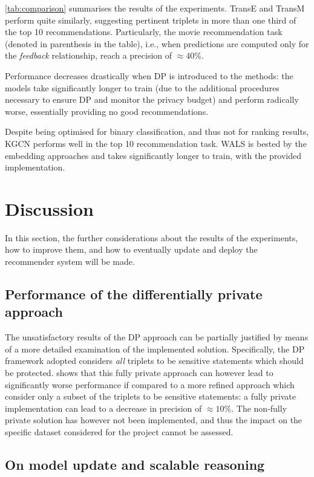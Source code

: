 \cref{tab:comparison} summarises the results of the experiments.
TransE and TransM perform quite similarly, suggesting pertinent triplets in more than one third of the top 10 recommendations.
Particularly, the movie recommendation task (denoted in parenthesis in the table), i.e., when predictions are computed only for the \emph{feedback} relationship, reach a precision of $\approx{40}\%$.

Performance decreases drastically when DP is introduced to the methods: the models take significantly longer to train (due to the additional procedures necessary to ensure DP and monitor the privacy budget) and perform radically worse, essentially providing no good recommendations.

Despite being optimised for binary classification, and thus not for ranking results, KGCN performs well in the top 10 recommendation task.
WALS is bested by the embedding approaches and takes significantly longer to train, with the provided implementation.

\section{Discussion}\label{sec:discussion}

In this section, the further considerations about the results of the experiments, how to improve them, and how to eventually update and deploy the recommender system will be made.


\subsection{Performance of the differentially private approach}

The unsatisfactory results of the DP approach can be partially justified by means of a more detailed examination of the implemented solution.
Specifically, the DP framework adopted considers \emph{all} triplets to be sensitive statements which should be protected.
\cite{han2022framework} shows that this fully private approach can however lead to significantly worse performance if compared to a more refined approach which consider only a subset of the triplets to be sensitive statements: a fully private implementation can lead to a decrease in precision of $\approx 10\%$.
The non-fully private solution has however not been implemented, and thus the impact on the specific dataset considered for the project cannot be assessed.


\subsection{On model update and scalable reasoning}

